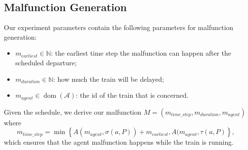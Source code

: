 \documentclass{article}
\DeclareMathOperator{\dom}{dom}
\begin{document}
\subsection{Malfunction Generation}\label{subsubsec:malfunctiongeneration}

Our experiment parameters contain the following parameters for malfunction generation:
\begin{itemize}
    \item $m_{earliest} \in \mathbb{N}$: the earliest time step the malfunction can happen after the scheduled departure;
    \item $m_{duration} \in \mathbb{N}$: how much the train will be delayed;
    \item $m_{agent} \in \dom(\mathcal{A})$: the id of the train that is concerned.
\end{itemize}

Given the schedule, we derive our malfunction $M=(m_{time\_step},m_{duration},m_{agent})$ where
\begin{equation*}
m_{time\_step} = \min \left\{  A(m_{agent},\sigma(a, P)) + m_{earliest},  A(m_{agent},\tau(a,P) \right\},
\end{equation*}
which ensures that the agent malfunction happens while the train is running.




\end{document}
